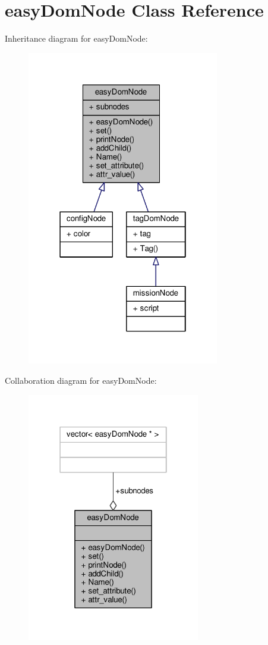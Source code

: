 \hypertarget{classeasyDomNode}{}\section{easy\+Dom\+Node Class Reference}
\label{classeasyDomNode}


Inheritance diagram for easy\+Dom\+Node\+:
\nopagebreak
\begin{figure}[H]
\begin{center}
\leavevmode
\includegraphics[width=238pt]{db/d08/classeasyDomNode__inherit__graph}
\end{center}
\end{figure}


Collaboration diagram for easy\+Dom\+Node\+:
\nopagebreak
\begin{figure}[H]
\begin{center}
\leavevmode
\includegraphics[width=214pt]{d9/d69/classeasyDomNode__coll__graph}
\end{center}
\end{figure}
